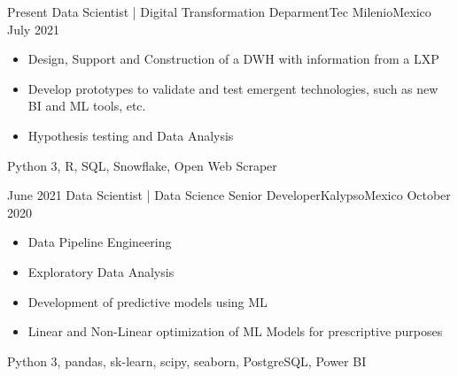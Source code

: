 %
%
%

\begin{experiences}
  \experience
    {Present}   {Data Scientist | Digital Transformation Deparment}{Tec Milenio}{Mexico}
    {July 2021} {
                      \begin{itemize}
                        \item Design, Support and Construction of a DWH with information from a LXP                      
                        \item Develop prototypes to validate and test emergent technologies, such as new BI and ML tools, etc.    
                        \item Hypothesis testing and Data Analysis                                                         
                      \end{itemize}
                    }
                    {Python 3, R, SQL, Snowflake, Open Web Scraper}
  \emptySeparator
  
  \experience
    {June 2021} {Data Scientist | Data Science Senior Developer}{Kalypso}{Mexico}
    {October 2020}    {
                      \begin{itemize}
                        \item Data Pipeline Engineering
                        \item Exploratory Data Analysis
                        \item Development of predictive models using ML
                        \item Linear and Non-Linear optimization of ML Models for prescriptive purposes
                      \end{itemize}
                    }
                    {Python 3, pandas, sk-learn, scipy, seaborn, PostgreSQL, Power BI}
  \emptySeparator
  

\end{experiences}
